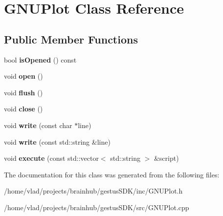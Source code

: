 \hypertarget{classGNUPlot}{}\section{G\+N\+U\+Plot Class Reference}
\label{classGNUPlot}
\subsection*{Public Member Functions}
\begin{DoxyCompactItemize}
\item 
\mbox{\label{classGNUPlot_a0564d60ca411f0d7fe794e34dcd68ecf}} 
bool {\bfseries is\+Opened} () const
\item 
\mbox{\label{classGNUPlot_a186ea2fed8f547252fd5db8e38660f1a}} 
void {\bfseries open} ()
\item 
\mbox{\label{classGNUPlot_ad6185af970ebace0913d8331c56eaebd}} 
void {\bfseries flush} ()
\item 
\mbox{\label{classGNUPlot_ab27c2ecae2068830d0e8c971d44bd676}} 
void {\bfseries close} ()
\item 
\mbox{\label{classGNUPlot_a2a229273dcf77c882931c8bd508cc909}} 
void {\bfseries write} (const char $\ast$line)
\item 
\mbox{\label{classGNUPlot_a42f713638f21a023e3dcebe013f431b4}} 
void {\bfseries write} (const std\+::string \&line)
\item 
\mbox{\label{classGNUPlot_a2774d4b9d63931b48aee47a1dbe55c96}} 
void {\bfseries execute} (const std\+::vector$<$ std\+::string $>$ \&script)
\end{DoxyCompactItemize}


The documentation for this class was generated from the following files\+:\begin{DoxyCompactItemize}
\item 
/home/vlad/projects/brainhub/gestus\+S\+D\+K/inc/G\+N\+U\+Plot.\+h\item 
/home/vlad/projects/brainhub/gestus\+S\+D\+K/src/G\+N\+U\+Plot.\+cpp\end{DoxyCompactItemize}
